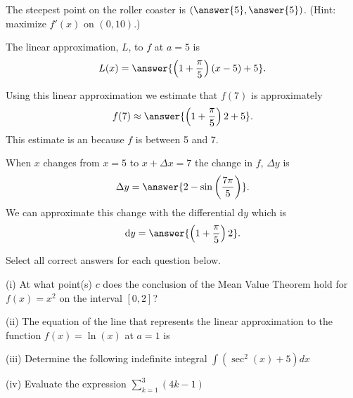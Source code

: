 \documentclass{ximera}
\begin{document}
\begin{exercise}
The steepest point on the roller coaster is $\left(\answer{5},\answer{5}\right)$. (Hint: maximize $f'(x)$ on $(0,10)$.)

The linear approximation, $L$, to $f$ at $a=5$ is
\[
L(x) = \answer{\left(1+\frac{\pi}{5}\right)(x-5) + 5}.
\]

Using this linear approximation we estimate that $f(7)$ is approximately
\[
f(7) \approx \answer{\left(1+\frac{\pi}{5}\right)2+5}.
\]
This estimate is an  because $f$ is  between 5 and 7.

When $x$ changes from $x=5$ to $x+\Delta x=7$ the change in $f$, $\Delta y$ is
\[
\Delta y = \answer{2-\sin\left(\frac{7\pi}{5}\right)}.
\]
We can approximate this change with the differential $\mathrm{d}y$ which is
\[
\mathrm{d}y = \answer{\left(1+\frac{\pi}{5}\right)2}.
\]
\end{exercise}

\begin{exercise}
Select all correct answers for each question below.

(i) At what point(s) $c$ does the conclusion of the Mean Value Theorem hold for $f(x)=x^2$ on the interval $[0,2]$?

\begin{selectAll}
\end{selectAll}

(ii) The equation of the line that represents the linear approximation to the function $f(x)=\ln(x)$ at $a=1$ is

\begin{selectAll}
\end{selectAll}

(iii) Determine the following indefinite integral $\int(\sec^2(x)+5)dx$

\begin{selectAll}
\end{selectAll}

(iv) Evaluate the expression $\sum_{k=1}^3(4k-1)$

\begin{selectAll}
\end{selectAll}
\end{exercise}
\end{document}
